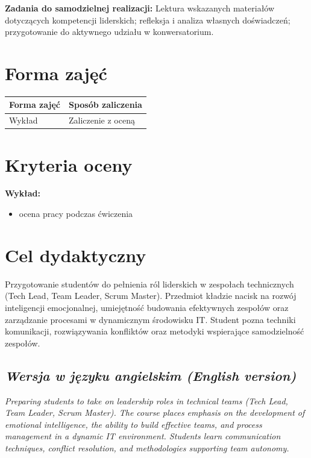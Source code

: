 \documentclass[12pt, a4paper]{article}
\newcommand{\thdrule}{\noalign{\global\setlength{\extrarowheight}{0pt}}}
\newcommand{\thdend}{\noalign{\global\setlength{\extrarowheight}{3pt}}}
\begin{document}
\vspace{4pt}
\noindent\textbf{Zadania do samodzielnej realizacji:} Lektura wskazanych materiałów dotyczących kompetencji liderskich; refleksja i analiza własnych doświadczeń; przygotowanie do aktywnego udziału w konwersatorium.

\section{Forma zajęć}

\begin{center}
{\scriptsize
\begin{tabular}{m{5cm}m{8cm}}
\thdrule\toprule
\rowcolor{pjatkRed} {\color{white}\textbf{Forma zajęć}} & {\color{white}\textbf{Sposób zaliczenia}} \\
\midrule\thdend
  \rowcolor{tableRowLight} Wykład & Zaliczenie z oceną \\
\bottomrule
\end{tabular}}
\end{center}

\section{Kryteria oceny}

\textbf{Wykład:}
\begin{itemize}
  \item ocena pracy podczas ćwiczenia
\end{itemize}
\vspace{4pt}


\section{Cel dydaktyczny}

Przygotowanie studentów do pełnienia ról liderskich w zespołach technicznych (Tech Lead, Team Leader, Scrum Master). Przedmiot kładzie nacisk na rozwój inteligencji emocjonalnej, umiejętność budowania efektywnych zespołów oraz zarządzanie procesami w dynamicznym środowisku IT. Student pozna techniki komunikacji, rozwiązywania konfliktów oraz metodyki wspierające samodzielność zespołów.

\subsection*{\textit{Wersja w języku angielskim (English version)}}

\textit{Preparing students to take on leadership roles in technical teams (Tech Lead, Team Leader, Scrum Master). The course places emphasis on the development of emotional intelligence, the ability to build effective teams, and process management in a dynamic IT environment. Students learn communication techniques, conflict resolution, and methodologies supporting team autonomy.}
\end{document}
